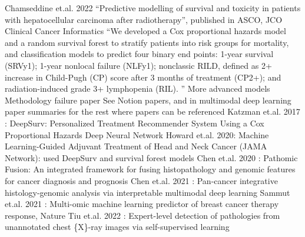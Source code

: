 \documentclass{article}%
\begin{document}
\newline%
%
Chamseddine et.al. 2022%
\newline%
\newline%
%
“Predictive modelling of survival and toxicity in patients with hepatocellular carcinoma after radiotherapy”, published in ASCO, JCO Clinical Cancer Informatics%
\newline%
\newline%
%
“We developed a Cox proportional hazards model and a random survival forest to stratify patients into risk groups for mortality, and classification models to predict four binary end points: 1{-}year survival (SRVy1); 1{-}year nonlocal failure (NLFy1); nonclassic RILD, defined as 2+ increase in Child{-}Pugh (CP) score after 3 months of treatment (CP2+); and radiation{-}induced grade 3+ lymphopenia (RIL). ”%
\newline%
\newline%
%
More advanced models%
\newline%
\newline%
%
Methodology failure paper%
\newline%
\newline%
%
See Notion papers, and in multimodal deep learning paper summaries for the rest where papers can be referenced%
\newline%
\newline%
%
Katzman et.al. 2017 : DeepSurv: Personalized Treatment Recommender System Using a Cox Proportional Hazards Deep Neural Network%
\newline%
\newline%
%
Howard et.al. 2020: Machine Learning{-}Guided Adjuvant Treatment of Head and Neck Cancer (JAMA Network): used DeepSurv and survival forest models%
\newline%
\newline%
%
Chen et.al. 2020 : Pathomic Fusion: An integrated framework for fusing histopathology and genomic features for cancer diagnosis and prognosis%
\newline%
\newline%
%
Chen et.al. 2021 : Pan{-}cancer integrative histology{-}genomic analysis via interpretable multimodal deep learning%
\newline%
\newline%
%
Sammut et.al. 2021 : Multi{-}omic machine learning predictor of breast cancer therapy response, Nature%
\newline%
\newline%
%
Tiu et.al. 2022 : Expert{-}level detection of pathologies from unannotated chest \{X\}{-}ray images via self{-}supervised learning%
\end{document}
